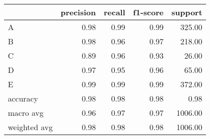 \begin{tabular}{|l|r|r|r|r|}
\hline
{} &  precision &  recall &  f1-score &  support \\
\hline
A            &       0.98 &    0.99 &      0.99 &   325.00 \\
B            &       0.98 &    0.96 &      0.97 &   218.00 \\
C            &       0.89 &    0.96 &      0.93 &    26.00 \\
D            &       0.97 &    0.95 &      0.96 &    65.00 \\
E            &       0.99 &    0.99 &      0.99 &   372.00 \\
accuracy     &       0.98 &    0.98 &      0.98 &     0.98 \\
macro avg    &       0.96 &    0.97 &      0.97 &  1006.00 \\
weighted avg &       0.98 &    0.98 &      0.98 &  1006.00 \\
\hline
\end{tabular}
